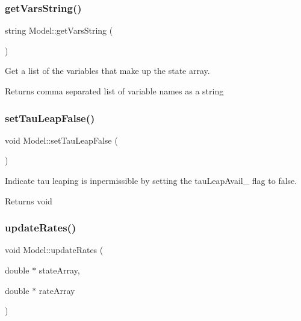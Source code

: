 \subsubsection{\texorpdfstring{get\+Vars\+String()}{getVarsString()}}
{\footnotesize\ttfamily string Model\+::get\+Vars\+String (\begin{DoxyParamCaption}{ }\end{DoxyParamCaption})}



Get a list of the variables that make up the state array. 

\begin{DoxyReturn}{Returns}
comma separated list of variable names as a string 
\end{DoxyReturn}
\mbox{\label{class_model_a371ba260fc741531a08a197ea7446758}} 
\subsubsection{\texorpdfstring{set\+Tau\+Leap\+False()}{setTauLeapFalse()}}
{\footnotesize\ttfamily void Model\+::set\+Tau\+Leap\+False (\begin{DoxyParamCaption}{ }\end{DoxyParamCaption})}



Indicate tau leaping is inpermissible by setting the tau\+Leap\+Avail\+\_\+ flag to false. 

\begin{DoxyReturn}{Returns}
void 
\end{DoxyReturn}
\mbox{\label{class_model_a3f2fd71261c87162718864d7efc67f2f}} 
\subsubsection{\texorpdfstring{update\+Rates()}{updateRates()}}
{\footnotesize\ttfamily void Model\+::update\+Rates (\begin{DoxyParamCaption}\item[{double $\ast$}]{state\+Array,  }\item[{double $\ast$}]{rate\+Array }\end{DoxyParamCaption})}



